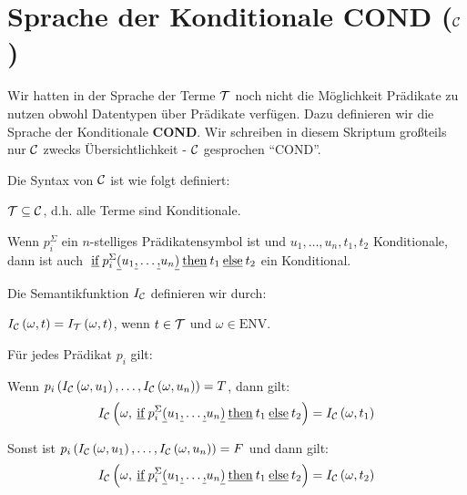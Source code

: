 \section{Sprache der Konditionale COND ($\mathcal{C}$)}
Wir hatten in der Sprache der Terme $\mathcal{T}$ noch nicht die Möglichkeit Prädikate zu nutzen obwohl Datentypen über
Prädikate verfügen. Dazu definieren wir die Sprache der Konditionale \textbf{COND}. Wir schreiben in diesem Skriptum großteils
nur $\mathcal{C}$ zwecks Übersichtlichkeit - $\mathcal{C}$ gesprochen ``COND''.
\begin{defn}\label{defn:semcond}
Die Syntax von $\mathcal{C}$ ist wie folgt definiert:
\begin{\whichenum}
\item $\mathcal{T} \subseteq \mathcal{C}$, d.h. alle Terme sind Konditionale.
\item Wenn $p^{\Sigma}_i$ ein $n$-stelliges Prädikatensymbol ist und $u_1,\ldots,u_n,t_1,t_2$ Konditionale,
dann ist auch \; ${\operatorname*{\:\underline{if}\:}} p_i^{\Sigma}\underline{(}u_1\underline{,}\ldots\underline{,}u_n\underline{)}{\operatorname*{\:\underline{then}\:}} t_1 {\operatorname*{\:\underline{else}\:}} t_2$ \; ein Konditional.
\end{\whichenum}
Die Semantikfunktion $I_{\mathcal{C}}$ definieren wir durch:
\begin{\whichenum}
\item $I_{\mathcal{C}}\left(\omega,t\right) = I_{\mathcal{T}}\left(\omega,t\right)$, wenn $t \in \mathcal{T}$ und $\omega \in \text{ENV}$.
\item Für jedes Prädikat $p_i$ gilt:
\begin{\whichitem}
\item Wenn $p_i\left(I_{\mathcal{C}}\left(\omega,u_1\right),\ldots,I_{\mathcal{C}}\left(\omega,u_n\right)\right)=T$, dann gilt:
\[I_{\mathcal{C}}\left(\omega,{\operatorname*{\:\underline{if}\:}} p_{i}^{\Sigma} \underline{(} u_1\underline{,}\ldots\underline{,}u_n\underline{)}{\operatorname*{\:\underline{then}\:}} t_1 {\operatorname*{\:\underline{else}\:}} t_2\right)=I_{\mathcal{C}}\left(\omega,t_1\right)\]
\item Sonst ist $p_i\left(I_{\mathcal{C}}\left(\omega,u_1\right),\ldots,I_{\mathcal{C}}\left(\omega,u_n\right)\right)=F$ und dann gilt:
\[I_{\mathcal{C}}\left(\omega,{\operatorname*{\:\underline{if}\:}} p_{i}^{\Sigma} \underline{(} u_1\underline{,}\ldots\underline{,}u_n\underline{)}{\operatorname*{\:\underline{then}\:}} t_1 {\operatorname*{\:\underline{else}\:}} t_2\right)=I_{\mathcal{C}}\left(\omega,t_2\right)\]
\end{\whichitem}
\end{\whichenum}
\end{defn}


